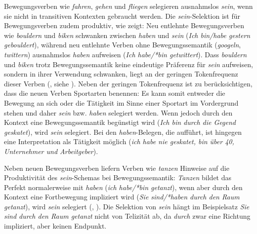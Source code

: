 Bewegungsverben wie \textit{fahren}, \textit{gehen} und \textit{fliegen} selegieren ausnahmslos \textit{sein}, wenn sie nicht in transitiven Kontexten gebraucht werden. Die \textit{sein}-Selektion ist für  Bewegungsverben zudem produktiv, wie \textcite[274--280]{Gillmann.2016} zeigt: Neu entlehnte Bewegungsverben wie \textit{bouldern} und \textit{biken} schwanken zwischen \textit{haben} und \textit{sein} (\textit{Ich bin/habe gestern gebouldert}), während neu entlehnte Verben ohne Bewegungssemantik (\textit{googeln}, \textit{twittern}) ausnahmslos \textit{haben} aufweisen (\textit{Ich habe/*bin getwittert}). Dass \textit{bouldern} und \textit{biken} trotz Bewegungssemantik keine eindeutige Präferenz für \textit{sein} aufweisen, sondern in ihrer Verwendung schwanken, liegt an der geringen Tokenfrequenz dieser Verben (\cite[272--274]{Gillmann.2016}, siehe ). Neben der geringen Tokenfrequenz ist zu berücksichtigen, dass die neuen Verben Sportarten benennen: Es kann somit entweder die Bewegung an sich oder die Tätigkeit im Sinne einer Sportart im Vordergrund stehen und daher \textit{sein} bzw. \textit{haben} selegiert werden. Wenn jedoch durch den Kontext eine Bewegungssemantik begünstigt wird (\textit{Ich bin durch die Gegend geskatet}), wird \textit{sein} selegiert. Bei den \textit{haben}-Belegen, die \textcite[277]{Gillmann.2016} aufführt, ist hingegen eine Interpretation als Tätigkeit möglich (\textit{ich habe nie geskatet, bin über 40, Unternehmer und Arbeitgeber}).  



Neben neuen Bewegungsverben liefern Verben wie \textit{tanzen} Hinweise auf die Produktivität des \textit{sein}-Schemas bei Bewegungssemantik: \textit{Tanzen} bildet das Perfekt normalerweise mit \textit{haben} (\textit{ich habe/*bin getanzt}), wenn aber durch den Kontext eine Fortbewegung impliziert wird (\textit{Sie sind/*haben durch den Raum getanzt}), wird \textit{sein} selegiert (\cite[334--335]{Randall.2004}, \cite[275--276]{Gillmann.2016}). Die Selektion von \textit{sein} hängt im Beispielsatz \textit{Sie sind durch den Raum getanzt} nicht von Telizität ab, da \textit{durch} zwar eine Richtung impliziert, aber keinen Endpunkt. 



